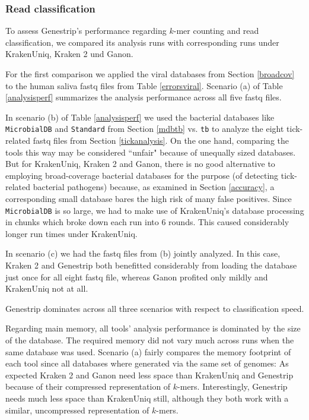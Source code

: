 \documentclass[pdflatex,sn-vancouver-num]{sn-jnl}
\begin{document}
    \subsubsection{Read classification}
    \label{runtimeperf}

    To assess Genestrip's performance regarding $k$-mer counting and read classification, we compared its analysis runs with corresponding runs under KrakenUniq, Kraken 2 und Ganon.

    For the first comparison we applied the viral databases from  Section \ref{broadcov} to the human saliva fastq files from Table \ref{errorsviral}. Scenario (a) of Table \ref{analysisperf} summarizes the analysis performance across all five fastq files.
    
     In scenario (b) of Table \ref{analysisperf} we used the  bacterial databases like \texttt{MicrobialDB} and \texttt{Standard} from Section \ref{mdbtb} vs. \texttt{tb} to analyze the eight tick-related fastq files from Section \ref{tickanalysis}. On the one hand, comparing the tools this way may be considered ``unfair" because of unequally sized databases. But for KrakenUniq, Kraken 2 and Ganon, there is no good alternative to employing broad-coverage bacterial databases for the purpose (of detecting tick-related bacterial pathogens) because, as examined in Section \ref{accuracy}, a corresponding small database bares the high risk of many false positives.
     Since \texttt{MicrobialDB} is so large, we had to make use of KrakenUniq's database processing in chunks which broke down each run into 6 rounds. This caused considerably longer run times under KrakenUniq.
     
     In scenario (c) we had the fastq files from (b) jointly analyzed.
     In this case, Kraken 2 and Genestrip both benefitted considerably from loading the database just once for all eight fastq file, whereas Ganon profited only mildly and KrakenUniq not at all.

      Genestrip dominates across all three scenarios with respect to classification speed.     

    Regarding main memory, all tools' analysis performance is dominated by the size of the database. The required memory did not vary much across runs when the same database was used. Scenario (a) fairly compares the memory footprint of each tool since all databases where generated via the same set of genomes: As expected Kraken 2 and Ganon need less space than KrakenUniq and Genestrip because of their compressed representation of $k$-mers. Interestingly, Genestrip needs much less space than KrakenUniq still, although they both work with a similar, uncompressed representation of $k$-mers.
    
\end{document}
